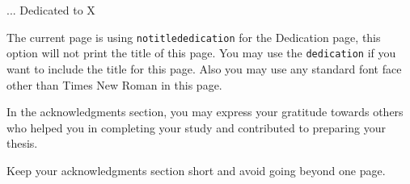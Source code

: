 \documentclass[a4paper,12pt,oneside]{report}
\begin{document}
\begin{notitlededication} %
\vspace{\fill}
\begin{center}
{\calligra... Dedicated to X} %

The current page is using \texttt{notitlededication} for the Dedication page, this option will not print the title of this page. You may use the \texttt{dedication} if you want to include the title for this page. Also you may use any standard font face other than Times New Roman in this page.
\end{center}
\vspace{\fill}
\end{notitlededication}

\begin{acknowledgements}

In the acknowledgments section, you may express your gratitude towards others who helped you in completing your study and contributed to preparing your thesis.

Keep your acknowledgments section short and avoid going beyond one page.

\end{acknowledgements}


\tableofcontents

\listoftables

\listoffigures

\end{document}
